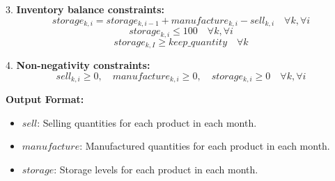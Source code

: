 \documentclass{article}
\begin{document}
3. \textbf{Inventory balance constraints:}
\[
storage_{k,i} = storage_{k,i-1} + manufacture_{k,i} - sell_{k,i} \quad \forall k, \forall i
\]
\[
storage_{k,i} \leq 100 \quad \forall k, \forall i
\]
\[
storage_{k,I} \geq keep\_quantity \quad \forall k
\]

4. \textbf{Non-negativity constraints:}
\[
sell_{k,i} \geq 0, \quad manufacture_{k,i} \geq 0, \quad storage_{k,i} \geq 0 \quad \forall k, \forall i
\]

\textbf{Output Format:}
\begin{itemize}
    \item \( sell \): Selling quantities for each product in each month.
    \item \( manufacture \): Manufactured quantities for each product in each month.
    \item \( storage \): Storage levels for each product in each month.
\end{itemize}
\end{document}
